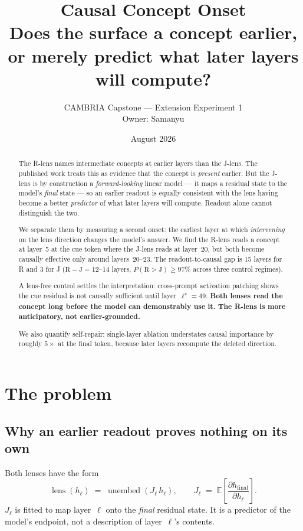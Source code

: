 \documentclass[11pt,a4paper]{article}
\title{\textbf{Causal Concept Onset}\\[0.3em]
       \large Does the \rlens{} surface a concept earlier,\\
       or merely predict what later layers will compute?}
\author{CAMBRIA Capstone --- Extension Experiment 1\\ \small Owner: Samanyu}
\date{August 2026}
\newcommand{\jlens}{J\nobreakdash-lens}
\newcommand{\rlens}{R\nobreakdash-lens}
\begin{document}
\maketitle

\begin{abstract}
\noindent
The \rlens{} names intermediate concepts at earlier layers than the \jlens. The
published work treats this as evidence that the concept is \emph{present} earlier.
But the \jlens{} is by construction a \emph{forward-looking} linear model --- it maps a
residual state to the model's \emph{final} state --- so an earlier readout is equally
consistent with the lens having become a better \emph{predictor} of what later layers
will compute. Readout alone cannot distinguish the two.

We separate them by measuring a second onset: the earliest layer at which
\emph{intervening} on the lens direction changes the model's answer. We find the
\rlens{} reads a concept at layer~5 at the cue token where the \jlens{} reads at
layer~20, but both become causally effective only around layers~20--23. The
readout-to-causal gap is $15$ layers for R and $3$ for J
($\text{R}-\text{J} = 12$--$14$ layers, $P(\text{R}{>}\text{J}) \geq 97\%$ across three
control regimes).

A lens-free control settles the interpretation: cross-prompt activation patching shows
the cue residual is not causally sufficient until layer~$\ell^\star = 49$. \textbf{Both
lenses read the concept long before the model can demonstrably use it. The \rlens{}
is more anticipatory, not earlier-grounded.}

We also quantify self-repair: single-layer ablation understates causal importance by
roughly $5\times$ at the final token, because later layers recompute the deleted
direction.
\end{abstract}

\tableofcontents
\newpage

\section{The problem}

\subsection{Why an earlier readout proves nothing on its own}

Both lenses have the form
\begin{equation}
  \operatorname{lens}(h_\ell) \;=\; \operatorname{unembed}(J_\ell\, h_\ell),
  \qquad
  J_\ell \;=\; \mathbb{E}\!\left[\frac{\partial h_{\text{final}}}{\partial h_\ell}\right].
\end{equation}
$J_\ell$ is fitted to map layer~$\ell$ onto the \emph{final} residual state. It is a
predictor of the model's endpoint, not a description of layer~$\ell$'s contents.
\end{document}
